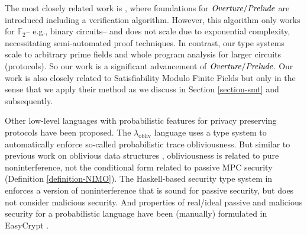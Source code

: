 
The most closely related work is \cite{skalka-near-ppdp24}, where
foundations for $\mathit{Overture}/\mathit{Prelude}$ are introduced including a
verification algorithm. However, this algorithm only works for
$\mathbb{F}_2$-- e.g., binary circuits-- and does not scale due to
exponential complexity, necessitating semi-automated proof
techniques. In contrast, our type systems scale to arbitrary prime
fields and whole program analysis for larger circuits (protocols). So
our work is a significant advancement of $\mathit{Overture}/\mathit{Prelude}$.  Our
work is also closely related to Satisfiability Modulo Finite Fields
\cite{SMFF} but only in the sense that we apply their method as we
discuss in Section \ref{section-smt} and subsequently.

Other low-level languages with probabilistic features for privacy
preserving protocols have been proposed. The
$\lambda_{\mathrm{obliv}}$ language \cite{darais2019language} uses a
type system to automatically enforce so-called probabilistic trace
obliviousness.  But similar to previous work on oblivious data
structures \cite{10.1145/3498713}, obliviousness is related to pure
noninterference, not the conditional form related to passive MPC
security (Definition \ref{definition-NIMO}). The Haskell-based security
type system in \cite{6266151} enforces a version of noninterference
that is sound for passive security, but does not consider malicious
security. And properties of real/ideal passive and malicious security
for a probabilistic language have been (manually) formulated in
EasyCrypt \cite{8429300}.

\compwrapfig

